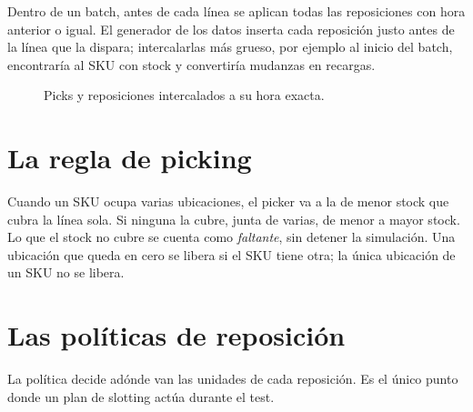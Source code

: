 \documentclass[11pt,a4paper,oneside]{report}
\begin{document}
Dentro de un batch, antes de cada línea se aplican todas las reposiciones con hora anterior o
igual. El generador de los datos inserta cada reposición justo antes de la línea que la
dispara; intercalarlas más grueso, por ejemplo al inicio del batch, encontraría al SKU con
stock y convertiría mudanzas en recargas.

\begin{figure}[ht]
\centering
{}
\caption{Picks y reposiciones intercalados a su hora exacta.}
\label{fig:eventos}
\end{figure}

\section{La regla de picking}

Cuando un SKU ocupa varias ubicaciones, el picker va a la de menor stock que cubra la línea
sola. Si ninguna la cubre, junta de varias, de menor a mayor stock. Lo que el stock no cubre
se cuenta como \emph{faltante}, sin detener la simulación. Una ubicación que queda en cero se
libera si el SKU tiene otra; la única ubicación de un SKU no se libera.

\section{Las políticas de reposición}
\label{sec:reposicion}

La política decide adónde van las unidades de cada reposición. Es el único punto donde un
plan de slotting actúa durante el test.
\end{document}
